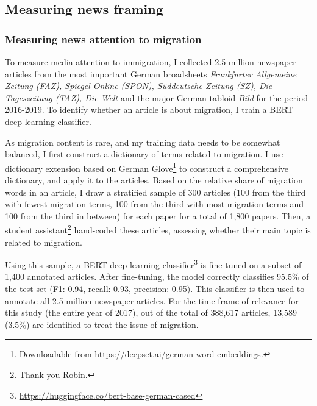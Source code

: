 \documentclass{article}
\begin{document}
\subsection{Measuring news framing}

\subsubsection{Measuring news attention to migration}

To measure media attention to immigration, I collected 2.5 million newspaper articles from the most important German broadsheets \textit{Frankfurter Allgemeine Zeitung (FAZ), Spiegel Online (SPON), Süddeutsche Zeitung (SZ), Die Tageszeitung (TAZ), Die Welt} and the major German tabloid \textit{Bild} for the period 2016-2019. To identify whether an article is about migration, I train a BERT deep-learning classifier. 

As migration content is rare, and my training data needs to be somewhat balanced, I first construct a dictionary of terms related to migration. I use dictionary extension based on German Glove\footnote{Downloadable from \url{https://deepset.ai/german-word-embeddings}.} to construct a comprehensive dictionary, and apply it to the articles. Based on the relative share of migration words in an article, I draw a stratified sample of 300 articles (100 from the third with fewest migration terms, 100 from the third with most migration terms and 100 from the third in between) for each paper for a total of 1,800 papers. Then, a student assistant\footnote{Thank you Robin.} hand-coded these articles, assessing whether their main topic is related to migration. 

Using this sample, a BERT deep-learning classifier\footnote{\url{https://huggingface.co/bert-base-german-cased}} is fine-tuned on a subset of 1,400 annotated articles. After fine-tuning, the model correctly classifies 95.5\% of the test set (F1: 0.94, recall: 0.93, precision: 0.95). This classifier is then used to annotate all 2.5 million newspaper articles. For the time frame of relevance for this study (the entire year of 2017), out of the total of 388,617 articles, 13,589 (3.5\%) are identified to treat the issue of migration.
\end{document}
